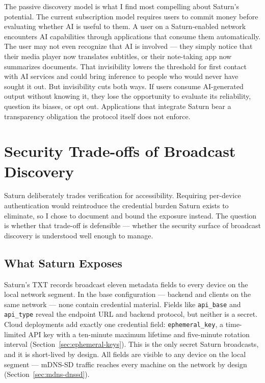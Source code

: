 The passive discovery model is what I find most compelling about Saturn's potential. The current subscription model requires users to commit money before evaluating whether AI is useful to them. A user on a Saturn-enabled network encounters AI capabilities through applications that consume them automatically. The user may not even recognize that AI is involved --- they simply notice that their media player now translates subtitles, or their note-taking app now summarizes documents. That invisibility lowers the threshold for first contact with AI services and could bring inference to people who would never have sought it out. But invisibility cuts both ways. If users consume AI-generated output without knowing it, they lose the opportunity to evaluate its reliability, question its biases, or opt out. Applications that integrate Saturn bear a transparency obligation the protocol itself does not enforce.

\section{Security Trade-offs of Broadcast Discovery}
\label{sec:security-tradeoffs}

Saturn deliberately trades verification for accessibility. Requiring per-device authentication would reintroduce the credential burden Saturn exists to eliminate, so I chose to document and bound the exposure instead. The question is whether that trade-off is defensible --- whether the security surface of broadcast discovery is understood well enough to manage.

\subsection{What Saturn Exposes}

Saturn's TXT records broadcast eleven metadata fields to every device on the local network segment. In the base configuration --- backend and clients on the same network --- none contain credential material. Fields like \texttt{api\_base} and \texttt{api\_type} reveal the endpoint URL and backend protocol, but neither is a secret. Cloud deployments add exactly one credential field: \texttt{ephemeral\_key}, a time-limited API key with a ten-minute maximum lifetime and five-minute rotation interval (Section~\ref{sec:ephemeral-keys}). This is the only secret Saturn broadcasts, and it is short-lived by design. All fields are visible to any device on the local segment --- mDNS-SD traffic reaches every machine on the network by design (Section~\ref{sec:mdns-dnssd}).

